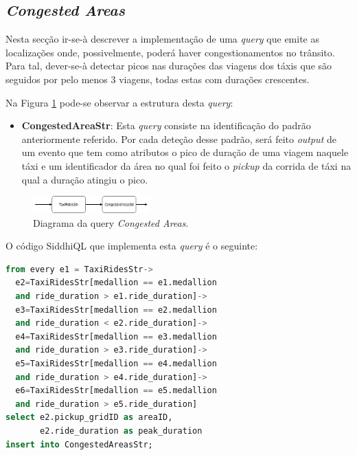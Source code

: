 \documentclass[article]{IEEEtran}
\begin{document}
\subsection{\textit{Congested Areas}}

Nesta secção ir-se-à descrever a implementação de uma \textit{query} que emite as localizações onde, possivelmente, poderá haver congestionamentos no trânsito. Para tal, dever-se-à detectar picos nas durações das viagens dos táxis que são seguidos por pelo menos 3 viagens, todas estas com durações crescentes.

Na Figura \ref{fig:congestedAreasDiagram} pode-se observar a estrutura desta \textit{query}:

\begin{itemize}
    \item \textbf{CongestedAreaStr}: Esta \textit{query} consiste na identificação do padrão anteriormente referido. Por cada  deteção desse padrão, será feito \textit{output} de um evento que tem como atributos o pico de duração de uma viagem naquele táxi e um identificador da área no qual foi feito o \textit{pickup} da corrida de táxi na qual a duração atingiu o pico.
\end{itemize} 
\begin{figure}[hbtp]
    \centering
        \includegraphics[width=0.4\textwidth]{images/congestedAreas}
    \caption{Diagrama da query \textit{Congested Areas}.}
    \label{fig:congestedAreasDiagram}
\end{figure}

O código SiddhiQL que implementa esta \textit{query} é o seguinte:

\begin{lstlisting}[language=SQL]
from every e1 = TaxiRidesStr->
  e2=TaxiRidesStr[medallion == e1.medallion 
  and ride_duration > e1.ride_duration]->
  e3=TaxiRidesStr[medallion == e2.medallion 
  and ride_duration < e2.ride_duration]->
  e4=TaxiRidesStr[medallion == e3.medallion
  and ride_duration > e3.ride_duration]->
  e5=TaxiRidesStr[medallion == e4.medallion 
  and ride_duration > e4.ride_duration]->
  e6=TaxiRidesStr[medallion == e5.medallion
  and ride_duration > e5.ride_duration]
select e2.pickup_gridID as areaID, 
       e2.ride_duration as peak_duration
insert into CongestedAreasStr;
\end{lstlisting}
\end{document}

